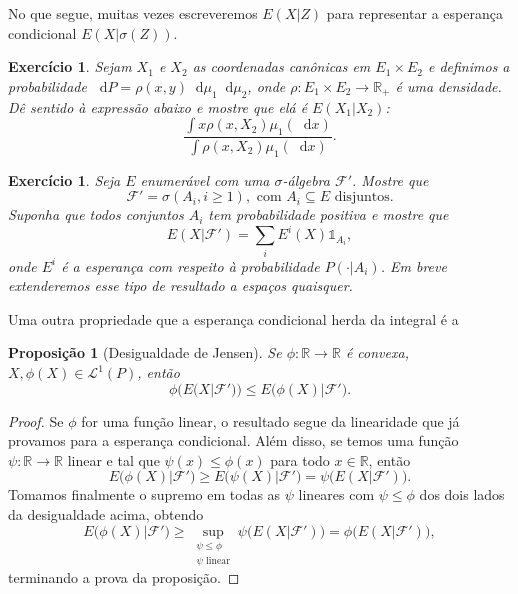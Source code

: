 \documentclass[reqno, final]{book}
\newcommand*\1{\mathds{1}}
\newtheorem{proposition}[theorem]{Proposição}
\newtheorem{exercise}[example]{Exercício}
\renewcommand*\d{\mathop{}\!\mathrm{d}}
\begin{document}
No que segue, muitas vezes escreveremos $E(X|Z)$ para representar a esperança condicional $E(X|\sigma(Z))$.

\begin{exercise}
  Sejam $X_1$ e $X_2$ as coordenadas canônicas em $E_1 \times E_2$ e definimos a probabilidade $\d P = \rho(x,y) \d \mu_1 \d \mu_2$, onde $\rho:E_1 \times E_2 \to \mathbb{R}_+$ é uma densidade.
  Dê sentido à expressão abaixo e mostre que elá é $E(X_1|X_2)$:
  \begin{equation}
     \frac{\int x\rho(x, X_2) \mu_1(\d x)}{\int \rho(x, X_2) \mu_1(\d x)}.
  \end{equation}
\end{exercise}

\begin{exercise}
  Seja $E$ enumerável com uma $\sigma$-álgebra $\mathcal{F}'$.
  Mostre que
  \begin{equation}
    \mathcal{F}' = \sigma(A_i, i \geq 1), \text{ com $A_i \subseteq E$ disjuntos}.
  \end{equation}
  Suponha que todos conjuntos $A_i$ tem probabilidade positiva e mostre que
  \begin{equation}
    E(X|\mathcal{F}') = \sum_i E^i(X) \1_{A_i},
  \end{equation}
  onde $E^i$ é a esperança com respeito à probabilidade $P(\cdot|A_i)$.
  Em breve extenderemos esse tipo de resultado a espaços quaisquer.
\end{exercise}

Uma outra propriedade que a esperança condicional herda da integral é a

\begin{proposition}[Desigualdade de Jensen]
  Se $\phi:\mathbb{R} \to \mathbb{R}$ é convexa, $X, \phi(X) \in \mathcal{L}^1(P)$, então
  \begin{equation}
    \phi\big( E(X|\mathcal{F}') \big) \leq E\big( \phi(X) | \mathcal{F}' \big).
  \end{equation}
\end{proposition}

\begin{proof}
  Se $\phi$ for uma função linear, o resultado segue da linearidade que já provamos para a esperança condicional.
  Além disso, se temos uma função $\psi:\mathbb{R} \to \mathbb{R}$ linear e tal que $\psi(x) \leq \phi(x)$ para todo $x \in \mathbb{R}$, então
  \begin{equation}
    E\big( \phi(X) | \mathcal{F}' \big) \geq E\big( \psi(X) | \mathcal{F}' \big) = \psi \big( E(X|\mathcal{F}') \big).
  \end{equation}
  Tomamos finalmente o supremo em todas as $\psi$ lineares com $\psi \leq \phi$ dos dois lados da desigualdade acima, obtendo
  \begin{equation}
    E\big( \phi(X) | \mathcal{F}' \big) \geq \sup_{\substack{\psi \leq \phi\\\psi \text{ linear}}} \psi \big( E(X|\mathcal{F}') \big) = \phi \big( E(X|\mathcal{F}') \big),
  \end{equation}
  terminando a prova da proposição.
\end{proof}
\end{document}
